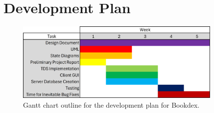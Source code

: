\documentclass[../design_doc.tex]{subfiles}
\begin{document}
\section{Development Plan}\label{sec:plan}

    \begin{figure}[h]
        \centering
        \includegraphics[width=0.9\textwidth]{gantt_chart.png}
        \caption{Gantt chart outline for the development plan for Bookdex.}\label{fig:gantt}
    \end{figure}
\end{document}
